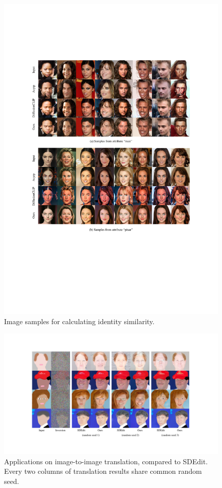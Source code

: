 \documentclass[letterpaper]{article} %
\begin{document}
\begin{figure}[t]
    \centering
    \includegraphics[width=1\textwidth]{Figs/fig15.pdf}
    \caption{Image samples for calculating identity similarity.}
    \label{fig16}
\end{figure}


\begin{figure}[t]
    \centering
    \includegraphics[width=1\textwidth]{Figs/fig16.pdf}
    \caption{Applications on image-to-image translation, compared to SDEdit\cite{meng2021sdedit}. Every two columns of translation results share common random seed. }
    \label{fig17}
\end{figure}
\end{document}
